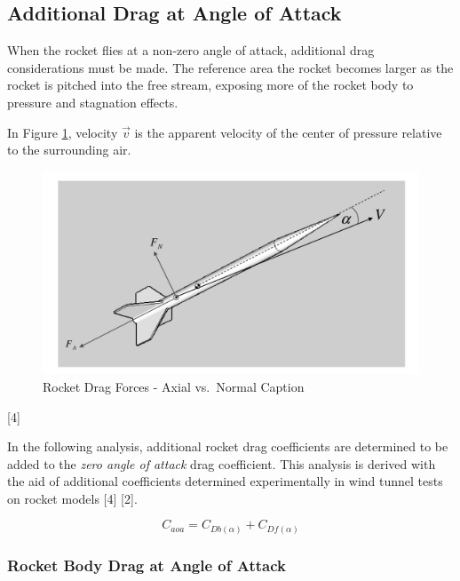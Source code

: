 \documentclass[]{article}
\begin{document}
\clearpage 

\subsection{Additional Drag at Angle of
Attack}\label{additional-drag-at-angle-of-attack}

When the rocket flies at a non-zero angle of attack, additional drag
considerations must be made. The reference area the rocket becomes
larger as the rocket is pitched into the free stream, exposing more of
the rocket body to pressure and stagnation effects.

In Figure \ref{rocket_drag_aoa_label}, velocity \(\vec{v}\) is the
apparent velocity of the center of pressure relative to the surrounding
air.

\begin{figure}[htbp]
\centering
\includegraphics{images/rocket_drag_forces.png}
\caption{Rocket Drag Forces - Axial vs.~Normal Caption
\label{rocket_drag_aoa_label}}
\end{figure}

{[}4{]}

In the following analysis, additional rocket drag coefficients are
determined to be added to the \emph{zero angle of attack} drag
coefficient. This analysis is derived with the aid of additional
coefficients determined experimentally in wind tunnel tests on rocket
models {[}4{]} {[}2{]}.

\begin{equation}
\label{eq_rocket_drag_aoa}
C_{aoa} = C_{Db(\alpha)} + C_{Df(\alpha)}
\end{equation}

\subsubsection{Rocket Body Drag at Angle of
Attack}\label{rocket-body-drag-at-angle-of-attack}
\end{document}
